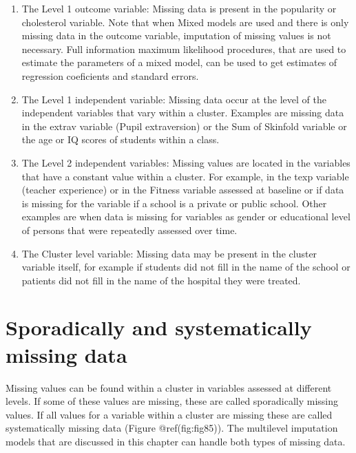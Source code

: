 \documentclass[
]{book}
\begin{document}
\begin{enumerate}
\def\labelenumi{\arabic{enumi})}
\item
  The Level 1 outcome variable: Missing data is present in the
  popularity or cholesterol variable. Note that when Mixed models are
  used and there is only missing data in the outcome variable,
  imputation of missing values is not necessary. Full information
  maximum likelihood procedures, that are used to estimate the
  parameters of a mixed model, can be used to get estimates of
  regression coeficients and standard errors.
\item
  The Level 1 independent variable: Missing data occur at the level of
  the independent variables that vary within a cluster. Examples are
  missing data in the extrav variable (Pupil extraversion) or the Sum of
  Skinfold variable or the age or IQ scores of students within a class.
\item
  The Level 2 independent variables: Missing values are located in the
  variables that have a constant value within a cluster. For example, in
  the texp variable (teacher experience) or in the Fitness variable
  assessed at baseline or if data is missing for the variable if a
  school is a private or public school. Other examples are when data is
  missing for variables as gender or educational level of persons that
  were repeatedly assessed over time.
\item
  The Cluster level variable: Missing data may be present in the cluster
  variable itself, for example if students did not fill in the name of
  the school or patients did not fill in the name of the hospital they
  were treated.
\end{enumerate}

\hypertarget{sporadically-and-systematically-missing-data}{%
\section{Sporadically and systematically missing
data}\label{sporadically-and-systematically-missing-data}}

Missing values can be found within a cluster in variables assessed at
different levels. If some of these values are missing, these are called
sporadically missing values. If all values for a variable within a
cluster are missing these are called systematically missing data (Figure
@ref(fig:fig85)). The multilevel imputation models that are discussed in
this chapter can handle both types of missing data.
\end{document}
